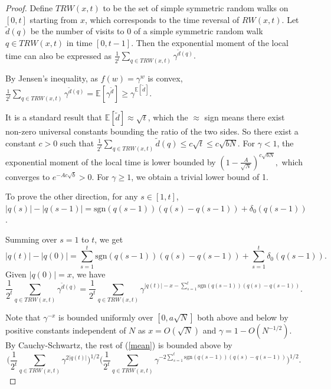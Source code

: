 \documentclass[10pt,a4paper]{amsart}
\begin{document}
\begin{proof}

Define $TRW(x,t)$ to be the set of simple symmetric random walks on $[0, t]$ starting from $x$, which corresponds to the time reversal of $RW(x,t)$. Let $\tilde{d}(q)$ be the number of visits to 0 of a simple symmetric random walk $q \in TRW(x, t)$ in time $[0, t-1]$. Then the exponential moment of the local time can also be expressed as $\frac{1}{2^{t}}\sum_{q \in TRW(x,t)} \gamma^{\tilde{d}(q)}.$


By Jensen's inequality, as $f(w)=\gamma^w$ is convex, $\frac{1}{2^{t}}\sum_{q \in TRW(x,t)} \gamma^{\tilde{d}(q)} =\mathbb{E}[\gamma^{\tilde{d}}] \geq \gamma^{\mathbb{E}[\tilde{d}]}.$

It is a standard result that $\mathbb{E}[\tilde{d}] \approx \sqrt{t}$, which the $\approx$ sign means there exist non-zero universal constants bounding the ratio of the two sides. So there exist a constant $c>0$ such that $\frac{1}{2^{t}}\sum_{q \in TRW(x,t)} \tilde{d}(q) \leq c\sqrt{t} \leq c\sqrt{bN}$. For $\gamma <1$, the exponential moment of the local time is lower bounded by
$(1-\frac{A}{\sqrt{N}})^{c\sqrt{bN}},$
which converges to $e^{-Ac\sqrt{b}} >0$. For $\gamma\geq 1$, we obtain a trivial lower bound of 1.

To prove the other direction, for any $s \in [1,t]$,
 $|q(s)|-|q(s-1)| = \text{sgn}(q(s-1))(q(s)-q(s-1))+\delta_0(q(s-1))$.

Summing over $s=1$ to $t$, we get
\begin{equation} 
    |q(t)|-|q(0)|=\sum_{s=1}^t \text{sgn}(q(s-1))(q(s)-q(s-1)) + \sum_{s=1}^t \delta_0(q(s-1)).
\end{equation}
Given $|q(0)|=x$, we have
\begin{equation} \label{mean}
    \frac{1}{2^t}\sum_{q \in TRW(x,t)} \gamma^{\tilde{d}(q)}=\frac{1}{2^{t}}\sum_{q \in TRW(x,t)} \gamma^{|q(t)|-x-\sum_{s=1}^t \text{sgn}(q(s-1))(q(s)-q(s-1))}.
\end{equation}

Note that $\gamma^{-x}$ is bounded uniformly over $[0, a\sqrt{N}]$ both above and below by positive constants independent of $N$ as $x=O(\sqrt{N})$ and $\gamma =1-O(N^{-1/2})$. By Cauchy-Schwartz, the rest of (\ref{mean}) is bounded above by 
\begin{equation}
    \Big(\frac{1}{2^{t}}\sum_{q \in TRW(x,t)} \gamma^{2|q(t)|}\Big)^{1/2}\Big(\frac{1}{2^{t}}\sum_{q \in TRW(x,t)} \gamma^{-2\sum_{s=1}^t \text{sgn}(q(s-1))(q(s)-q(s-1))}\Big)^{1/2}.
\end{equation}


\end{proof}
\end{document}
